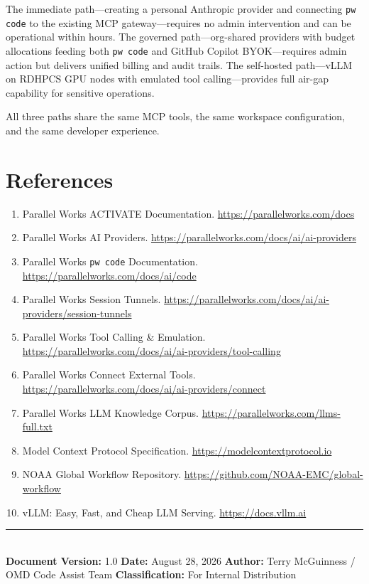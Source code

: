 \documentclass[11pt,letterpaper,twoside]{article}
\begin{document}
The immediate path---creating a personal Anthropic provider and connecting
\texttt{pw code} to the existing MCP gateway---requires no admin
intervention and can be operational within hours. The governed
path---org-shared providers with budget allocations feeding both
\texttt{pw code} and GitHub Copilot BYOK---requires admin action but
delivers unified billing and audit trails. The self-hosted path---vLLM on
RDHPCS GPU nodes with emulated tool calling---provides full air-gap
capability for sensitive operations.

All three paths share the same MCP tools, the same workspace configuration,
and the same developer experience.

\section*{References}
\label{sec:refs}

\begin{enumerate}
\item Parallel Works ACTIVATE Documentation.
  \url{https://parallelworks.com/docs}
\item Parallel Works AI Providers.
  \url{https://parallelworks.com/docs/ai/ai-providers}
\item Parallel Works \texttt{pw code} Documentation.
  \url{https://parallelworks.com/docs/ai/code}
\item Parallel Works Session Tunnels.
  \url{https://parallelworks.com/docs/ai/ai-providers/session-tunnels}
\item Parallel Works Tool Calling \& Emulation.
  \url{https://parallelworks.com/docs/ai/ai-providers/tool-calling}
\item Parallel Works Connect External Tools.
  \url{https://parallelworks.com/docs/ai/ai-providers/connect}
\item Parallel Works LLM Knowledge Corpus.
  \url{https://parallelworks.com/llms-full.txt}
\item Model Context Protocol Specification.
  \url{https://modelcontextprotocol.io}
\item NOAA Global Workflow Repository.
  \url{https://github.com/NOAA-EMC/global-workflow}
\item vLLM: Easy, Fast, and Cheap LLM Serving.
  \url{https://docs.vllm.ai}
\end{enumerate}

\vspace{1em}
\noindent\rule{\linewidth}{0.4pt}\\[6pt]
{\small
\textbf{Document Version:} 1.0 \quad\textbullet\quad
\textbf{Date:} August 28, 2026 \quad\textbullet\quad
\textbf{Author:} Terry McGuinness / OMD Code Assist Team \quad\textbullet\quad
\textbf{Classification:} For Internal Distribution}
\end{document}
